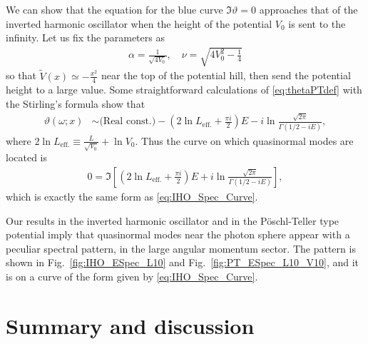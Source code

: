 \documentclass[a4paper,11pt]{article}
\begin{document}
We can show that the equation for the blue curve $\Im\vartheta=0$ approaches that of the inverted harmonic oscillator when the height of the potential $V_0$ is sent to the infinity.
Let us fix the parameters as
\begin{align}
    \alpha = \frac{1}{\sqrt{4V_0}}, \quad
    \nu = \sqrt{4V_0^2-\frac{1}{4}}
\end{align}
so that $\widetilde{V}(x)\simeq-\frac{x^2}{4}$ near the top of the potential hill,
then send the potential height to a large value.
Some straightforward calculations of \eqref{eq:thetaPTdef} with the Stirling's formula show that
\begin{align}
    \vartheta(\omega;x)
    &\sim
    \text{(Real const.)}
    -\left( 2\ln L_{\text{eff.}}+\frac{\pi i}{2} \right)E
    -i\ln\frac{\sqrt{2\pi}}{\Gamma(1/2-iE)},
\end{align}
where 
 $ 2 \ln L_{\text{eff.}} \equiv \frac{L}{\sqrt{V_0}}+\ln V_0$.
Thus the curve on which quasinormal modes are located is
\begin{align}
    \label{eq:PT_Spec_Curve}
    0 = \Im\left[
        \left( 2\ln L_{\text{eff.}} + \frac{\pi i}{2} \right)E
        +i\ln\frac{\sqrt{2\pi}}{\Gamma(1/2-iE)}
    \right],
\end{align}
which is exactly the same form as \eqref{eq:IHO_Spec_Curve}.


Our results in the inverted harmonic oscillator and in the P\"{o}schl-Teller type potential imply that quasinormal modes near the photon sphere appear with a peculiar spectral pattern, in the large angular momentum sector. The pattern is shown in Fig.~\ref{fig:IHO_ESpec_L10} and Fig.~\ref{fig:PT_ESpec_L10_V10}, and it is on a curve of the form given by \eqref{eq:IHO_Spec_Curve}.



\section{Summary and discussion}
\label{sec:5}
\end{document}
